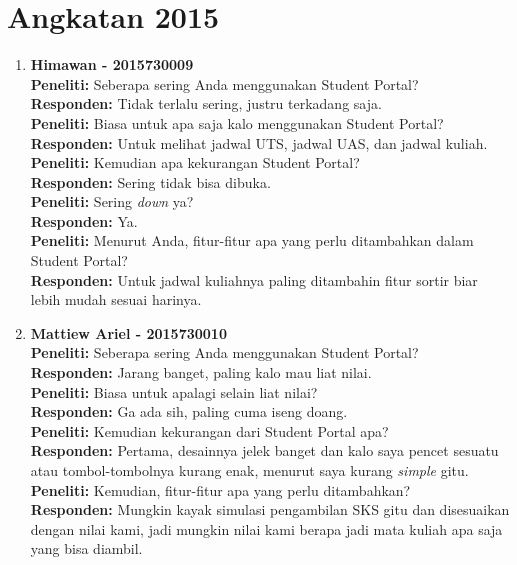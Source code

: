\section{Angkatan 2015}
\begin{enumerate}
\item\textbf{Himawan - 2015730009}\\
	\textbf{Peneliti:} Seberapa sering Anda menggunakan Student Portal?\\
	\textbf{Responden:} Tidak terlalu sering, justru terkadang saja.\\
	\textbf{Peneliti:} Biasa untuk apa saja kalo menggunakan Student Portal?\\
	\textbf{Responden:} Untuk melihat jadwal UTS, jadwal UAS, dan jadwal kuliah.\\
	\textbf{Peneliti:} Kemudian apa kekurangan Student Portal?\\
	\textbf{Responden:} Sering tidak bisa dibuka.\\
	\textbf{Peneliti:} Sering \textit{down} ya?\\
	\textbf{Responden:} Ya.\\
	\textbf{Peneliti:} Menurut Anda, fitur-fitur apa yang perlu ditambahkan dalam Student Portal?\\
	\textbf{Responden:} Untuk jadwal kuliahnya paling ditambahin fitur sortir biar lebih mudah sesuai harinya.\\
	
	\item\textbf{Mattiew Ariel - 2015730010}\\
	\textbf{Peneliti:} Seberapa sering Anda menggunakan Student Portal?\\
	\textbf{Responden:} Jarang banget, paling kalo mau liat nilai.\\
	\textbf{Peneliti:} Biasa untuk apalagi selain liat nilai?\\
	\textbf{Responden:} Ga ada sih, paling cuma iseng doang.\\
	\textbf{Peneliti:} Kemudian kekurangan dari Student Portal apa?\\
	\textbf{Responden:} Pertama, desainnya jelek banget dan kalo saya pencet sesuatu atau tombol-tombolnya kurang enak, menurut saya kurang \textit{simple} gitu.\\
	\textbf{Peneliti:} Kemudian, fitur-fitur apa yang perlu ditambahkan?\\
	\textbf{Responden:} Mungkin kayak simulasi pengambilan SKS gitu dan disesuaikan dengan nilai kami, jadi mungkin nilai kami berapa jadi mata kuliah apa saja yang bisa diambil.\\
	

\end{enumerate}

